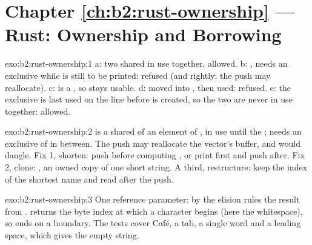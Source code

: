\section*{Chapter \ref{ch:b2:rust-ownership} --- Rust: Ownership and Borrowing}

\begin{solution}{exo:b2:rust-ownership:1}
a: two shared  in use together, allowed. b:   ,  needs an exclusive
 while  is still to be printed: refused (and rightly: the push may reallocate). c:  is a
, so  stays usable. d:  moved into , then used: refused. e: the exclusive 
 is last used on the line before  is created, so the two are never in use together: allowed.
\end{solution}

\begin{solution}{exo:b2:rust-ownership:2}
 is a shared  of an element of , in use until the ; 
needs an exclusive  of  in between. The push may reallocate the vector's buffer, and
 would dangle. Fix 1, shorten: push before computing , or print first and push after.
Fix 2, clone: , an owned copy of one
short string. A third, restructure: keep the index of the shortest name and read  after the push.
\end{solution}

\begin{solution}{exo:b2:rust-ownership:3}
One reference parameter: by the elision rules the result  from .  returns the byte index at
which a character begins (here the whitespace), so  ends on a boundary. The tests cover Café,
a tab, a single word and a leading space, which gives the empty string.
\end{solution}


